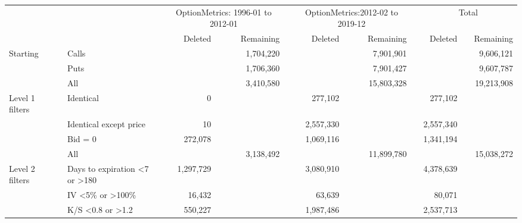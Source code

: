 

    \begin{tabular}{*{4}{l} *{11}{r} }
       
        
         \multicolumn{4}{c}{}  & \multicolumn{3}{c}{OptionMetrics: 1996-01 to 2012-01}  &  \multicolumn{1}{c}{} & 
         \multicolumn{3}{c}{OptionMetrics:2012-02 to 2019-12}&  \multicolumn{1}{c}{}  &
          \multicolumn{3}{c}{Total}  \\
         \cline{5-7}
                  
         \cline{9-11}
         \cline{13-15}
         
          &  & & & 
          Deleted &  & Remaining & &
          Deleted &  & Remaining & &
          Deleted &  & Remaining 
          \\

       \hline

	
				Starting & & Calls & &
				 & & 1,704,220 & &
				 & & 7,901,901 & &
				 & & 9,606,121 \\
			
				  & & Puts & &
				 & & 1,706,360 & &
				 & & 7,901,427 & &
				 & & 9,607,787 \\
			
				  & & All & &
				 & & 3,410,580 & &
				 & & 15,803,328 & &
				 & & 19,213,908 \\
			
				Level 1 filters & & Identical & &
				0 & &  & &
				277,102 & &  & &
				277,102 & &  \\
			
				  & & Identical except price & &
				10 & &  & &
				2,557,330 & &  & &
				2,557,340 & &  \\
			
				  & & Bid = 0 & &
				272,078 & &  & &
				1,069,116 & &  & &
				1,341,194 & &  \\
			
				  & & All & &
				 & & 3,138,492 & &
				 & & 11,899,780 & &
				 & & 15,038,272 \\
			
				Level 2 filters & & Days to expiration <7 or >180 & &
				1,297,729 & &  & &
				3,080,910 & &  & &
				4,378,639 & &  \\
			
				  & & IV <5\% or >100\% & &
				16,432 & &  & &
				63,639 & &  & &
				80,071 & &  \\
			
				  & & K/S <0.8 or >1.2 & &
				550,227 & &  & &
				1,987,486 & &  & &
				2,537,713 & &  \\
			

\end{tabular}

